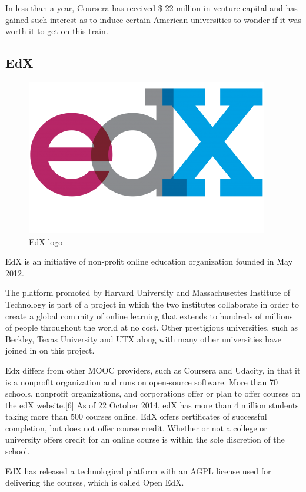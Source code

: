 In less than a year, Coursera has received \$ 22 million in venture capital and has gained such interest as to induce certain American universities to wonder if it was worth it to get on this train.

\subsection{EdX}
\label{subsec:EdX}
\begin{figure}[htb] %
 \centering
 \includegraphics[width=0.5\linewidth]{images/chapter1/edx_logo.png}\hfill
 \caption[EdX logo]{EdX logo}
 \label{fig:fourV}
\end{figure}

EdX is an initiative of non-profit online education organization founded in May 2012.


The platform promoted by Harvard University and Massachusettes Institute of Technology is part of a project in which the two institutes collaborate in order to create a global comunity of online learning that extends to hundreds of millions of people throughout the world at no cost. Other prestigious universities, such as Berkley, Texas University and UTX along with many other universities have joined in on this project.

Edx differs from other MOOC providers, such as Coursera and Udacity, in that it is a nonprofit organization and runs on open-source software.\cite{mooc_edx}
More than 70 schools, nonprofit organizations, and corporations offer or plan to offer courses on the edX website.[6] 
As of 22 October 2014, edX has more than 4 million students taking more than 500 courses online.\cite{mooc_edx}
EdX offers certificates of successful completion, but does not offer course credit. Whether or not a college or university offers credit for an online course is within the sole discretion of the school.\cite{mooc_edx}

EdX has released a technological platform with an AGPL license used for delivering the courses, which is called Open EdX.

